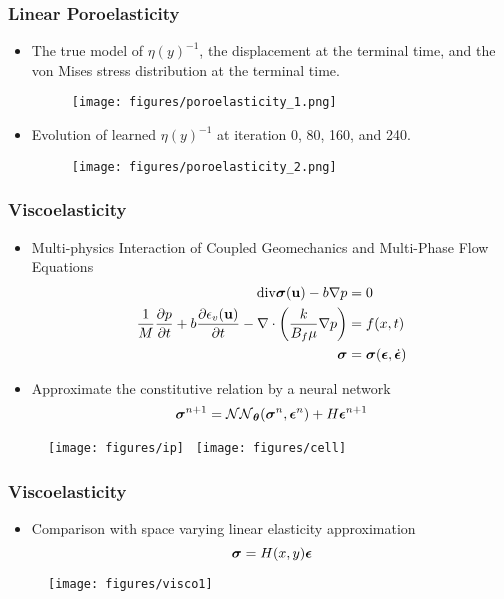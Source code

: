\documentclass[usenames,dvipsnames]{beamer}
\newcommand{\bt}[0]{\bm{\theta}}
\newcommand{\bu}{\mathbf{u}}
\begin{document}
\begin{frame}
	
	\frametitle{Linear Poroelasticity}
	
	\begin{itemize}
		\item The true model of $\eta(y)^{-1}$, the displacement at the terminal time, and the von Mises 
		stress distribution at the terminal time. 
		\begin{figure}
			\centering
			\texttt{[image: figures/poroelasticity\_1.png]}
		\end{figure}
	
		\item Evolution of learned $\eta(y)^{-1}$ at iteration 0, 80, 160, and 240. 
		\begin{figure}
			\centering
			\texttt{[image: figures/poroelasticity\_2.png]}
		\end{figure}
	\end{itemize}
	
\end{frame}


\begin{frame}

	\frametitle{Viscoelasticity}
	\begin{itemize}
		\item Multi-physics Interaction of Coupled Geomechanics and Multi-Phase Flow Equations 
		{\small
			\begin{align*}
			\mathrm{div}\bsigma(\bu) - b \nabla p &= 0\\
			\frac{1}{M} \frac{\partial p}{\partial t} + b\frac{\partial \epsilon_v(\bu)}{\partial t} - \nabla\cdot\left(\frac{k}{B_f\mu}\nabla p\right) &= f(x,t)	\\
			\bsigma &= \bsigma(\bepsilon, \dot\bepsilon)
			\end{align*}
		}
		\item Approximate the constitutive relation by a neural network
		{\small
			$$\bsigma^{n+1} = \mathcal{NN}_{\bt} (\bsigma^n, \bepsilon^n) + H\bepsilon^{n+1}$$}
	\end{itemize}		
	\begin{figure}[hbt]	
		\centering
		\texttt{[image: figures/ip]}~
		\texttt{[image: figures/cell]}
	\end{figure}
	
\end{frame}


\begin{frame}
	\frametitle{Viscoelasticity}
	
	\begin{itemize}
		\item Comparison with space varying linear elasticity approximation
		\begin{equation*}
		\bm{\sigma} = H(x, y) \bm{\epsilon}
		\end{equation*}
	\end{itemize}
	\begin{figure}[hbt]
		\texttt{[image: figures/visco1]}
	\end{figure}
	
\end{frame}
\end{document}
